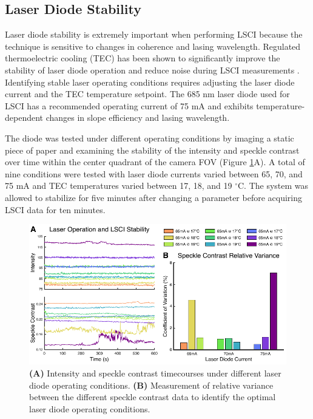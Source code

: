 \subsection{Laser Diode Stability}

Laser diode stability is extremely important when performing LSCI because the technique is sensitive to changes in coherence and lasing wavelength. Regulated thermoelectric cooling (TEC) has been shown to significantly improve the stability of laser diode operation and reduce noise during LSCI measurements \cite{Richards:2016hy}. Identifying stable laser operating conditions requires adjusting the laser diode current and the TEC temperature setpoint. The 685 nm laser diode used for LSCI has a recommended operating current of 75 mA and exhibits temperature-dependent changes in slope efficiency and lasing wavelength.

The diode was tested under different operating conditions by imaging a static piece of paper and examining the stability of the intensity and speckle contrast over time within the center quadrant of the camera FOV (Figure \ref{fig:laserstability}A). A total of nine conditions were tested with laser diode currents varied between 65, 70, and 75 mA and TEC temperatures varied between 17, 18, and 19 $^\circ$C. The system was allowed to stabilize for five minutes after changing a parameter before acquiring LSCI data for ten minutes.

\begin{figure}
    \includegraphics{figures/chapter_2/laserstability.pdf}
    \caption {
        \label{fig:laserstability}
        \textbf{(A)} Intensity and speckle contrast timecourses under different laser diode operating conditions. \textbf{(B)} Measurement of relative variance between the different speckle contrast data to identify the optimal laser diode operating conditions.
    }
\end{figure}

